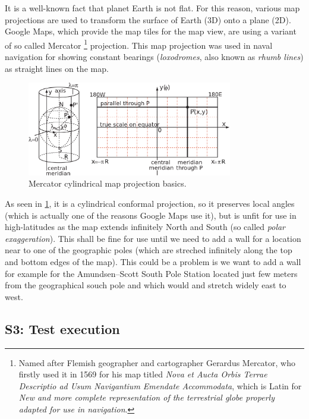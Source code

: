 \documentclass[11pt]{book}
\begin{document}
It is a well-known fact that planet Earth is not flat. For this reason, various map projections are used to transform the surface of Earth (3D) onto a plane (2D). Google Maps, which provide the map tiles for the map view, are using a variant of so called Mercator \footnote{Named after Flemish geographer and cartographer Gerardus Mercator, who firstly used it in 1569 for his map titled \emph{Nova et Aucta Orbis Terrae Descriptio ad Usum Navigantium Emendate Accommodata}, which is Latin for \emph{New and more complete representation of the terrestrial globe properly adapted for use in navigation}.} projection. This map projection was used in naval navigation for showing constant bearings (\emph{loxodromes}, also known as \emph{rhumb lines}) as straight lines on the map. \cite{progonos:mercator,radicalcartography} 

\begin{figure}[H]
    \centering
    \includegraphics[width=0.8\textwidth]{Figures/Prestudy/mercator.png}
    \caption{Mercator cylindrical map projection basics. \cite{wikipedia:mercator}}
    \label{fig:mercator}
\end{figure}

As seen in \ref{fig:mercator}, it is a cylindrical conformal projection, so it preserves local angles (which is actually one of the reasons Google Maps use it), but is unfit for use in high-latitudes as the map extends infinitely North and South (so called \emph{polar exaggeration}). This shall be fine for use until we need to add a wall for a location near to one of the geographic poles (which are streched infinitely along the top and bottom edges of the map). This could be a problem is we want to add a wall for example for the Amundsen–Scott South Pole Station located just few meters from the geographical souch pole and which would and stretch widely east to west. \cite{progonos:mercator,radicalcartography} 


\subsection{S3: Test execution}
\end{document}
